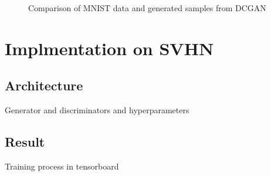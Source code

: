 \documentclass{article}
\begin{document}
\begin{figure}[!htb]
  \centering
  \caption{Comparison of MNIST data and generated samples from DCGAN}
  \label{fig:DCGAN_MNIST}
\end{figure}


\section{Implmentation on SVHN}

\subsection{Architecture}

Generator and discriminators and hyperparameters

\subsection{Result}

Training process in tensorboard
\end{document}
